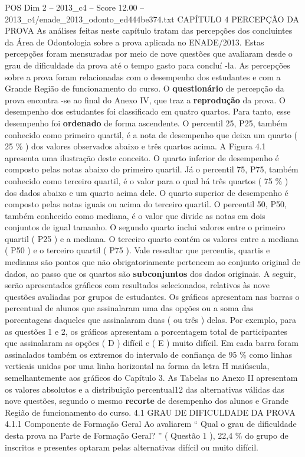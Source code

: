 \begin{textsample}{POS Dim 2 – 2013\_c4 – Score 12.00 – 2013\_c4/enade\_2013\_odonto\_ed444be374.txt}  \label{ex:f2_pos_066}
CAPÍTULO 4 PERCEPÇÃO DA PROVA As análises feitas neste capítulo tratam das percepções dos concluintes da Área de Odontologia sobre a prova aplicada no ENADE/2013.
Estas percepções foram mensuradas por meio de nove questões que avaliaram desde o grau de dificuldade da prova até o tempo gasto para concluí -la.
As percepções sobre a prova foram relacionadas com o desempenho dos estudantes e com a Grande Região de funcionamento do curso.
O \textbf{questionário} de percepção da prova encontra -se ao final do Anexo IV, que traz a \textbf{reprodução} da prova.
O desempenho dos estudantes foi classificado em quatro quartos.
Para tanto, esse desempenho foi \textbf{ordenado} de forma ascendente.
O percentil 25, P25, também conhecido como primeiro quartil, é a nota de desempenho que deixa um quarto ( 25 \% ) dos valores observados abaixo e três quartos acima.
A Figura 4.1 apresenta uma ilustração deste conceito.
O quarto inferior de desempenho é composto pelas notas abaixo do primeiro quartil.
Já o percentil 75, P75, também conhecido como terceiro quartil, é o valor para o qual há três quartos ( 75 \% ) dos dados abaixo e um quarto acima dele.
O quarto superior de desempenho é composto pelas notas iguais ou acima do terceiro quartil.
O percentil 50, P50, também conhecido como mediana, é o valor que divide as notas em dois conjuntos de igual tamanho.
O segundo quarto inclui valores entre o primeiro quartil ( P25 ) e a mediana.
O terceiro quarto contém os valores entre a mediana ( P50 ) e o terceiro quartil ( P75 ).
Vale ressaltar que percentis, quartis e medianas são pontos que não obrigatoriamente pertencem ao conjunto original de dados, ao passo que os quartos são \textbf{subconjuntos} dos dados originais.
A seguir, serão apresentados gráficos com resultados selecionados, relativos às nove questões avaliadas por grupos de estudantes.
Os gráficos apresentam nas barras o percentual de alunos que assinalaram uma das opções ou a soma das porcentagens daqueles que assinalaram duas ( ou três ) delas.
Por exemplo, para as questões 1 e 2, os gráficos apresentam a porcentagem total de participantes que assinalaram as opções ( D ) difícil e ( E ) muito difícil.
Em cada barra foram assinalados também os extremos do intervalo de confiança de 95 \% como linhas verticais unidas por uma linha horizontal na forma da letra H maiúscula, semelhantemente aos gráficos do Capítulo 3.
As Tabelas no Anexo II apresentam os valores absolutos e a distribuição percentual12 das alternativas válidas das nove questões, segundo o mesmo \textbf{recorte} de desempenho dos alunos e Grande Região de funcionamento do curso. 4.1 GRAU DE DIFICULDADE DA PROVA 4.1.1 Componente de Formação Geral Ao avaliarem “ Qual o grau de dificuldade desta prova na Parte de Formação Geral? ” ( Questão 1 ), 22,4 \% do grupo de inscritos e presentes optaram pelas alternativas difícil ou muito difícil.

\end{textsample}
